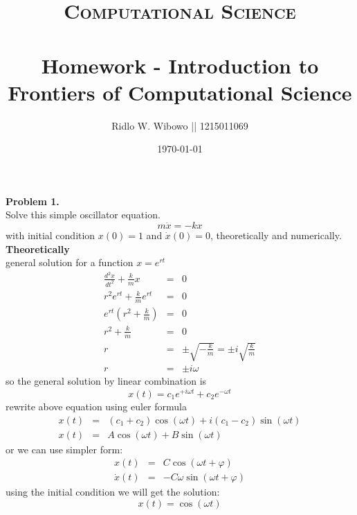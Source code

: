 \documentclass[paper=a4, fontsize=11pt]{scrartcl}
\title{	
\normalfont \normalsize 
\textsc{Computational Science} \\ [25pt] %
\horrule{0.5pt} \\[0.2cm] %
\small Homework - Introduction to Frontiers of Computational Science\\ %
}
\author{\small{Ridlo W. Wibowo || 1215011069}} %
\date{\small\today} %
\numberwithin{equation}{section} %
\numberwithin{figure}{section} %
\numberwithin{table}{section} %
\begin{document}
\maketitle %

\textbf{Problem 1.}\\
Solve this simple oscillator equation.
\begin{equation*}
m \ddot{x} = -k x
\end{equation*}
with initial condition $x(0) = 1$ and $\dot{x}(0) = 0$, theoretically and numerically.\\

\textbf{Theoretically}\\
general solution for a function $x = e^{rt}$
\begin{eqnarray*}
\frac{d^{2}x}{dt^2} + \frac{k}{m}x &=& 0 \\
r^2e^{rt} + \frac{k}{m}e^{rt} &=& 0 \\
e^{rt} ( r^2 + \frac{k}{m}) &=& 0 \\
r^2 + \frac{k}{m} &=& 0 \\
r &=& \pm \sqrt{-\frac{k}{m}} = \pm i \sqrt{\frac{k}{m}} \\
r &=& \pm i \omega
\end{eqnarray*}
so the general solution by linear combination is
\begin{equation*}
x(t) = c_1 e^{+i \omega t} + c_2 e^{- \omega t}
\end{equation*}
rewrite above equation using euler formula
\begin{eqnarray*}
x(t) &=& (c_1 + c_2) \cos(\omega t) + i(c_1 - c_2)\sin(\omega t)\\
x(t) &=& A\cos(\omega t) + B\sin(\omega t)
\end{eqnarray*}
or we can use simpler form:
\begin{eqnarray*}
x(t) &=& C\cos(\omega t + \varphi)\\
\dot{x}(t) &=& -C \omega \sin(\omega t + \varphi)
\end{eqnarray*}
using the initial condition we will get the solution:
\begin{equation*}
x(t) = \cos(\omega t)
\end{equation*}
\end{document}
